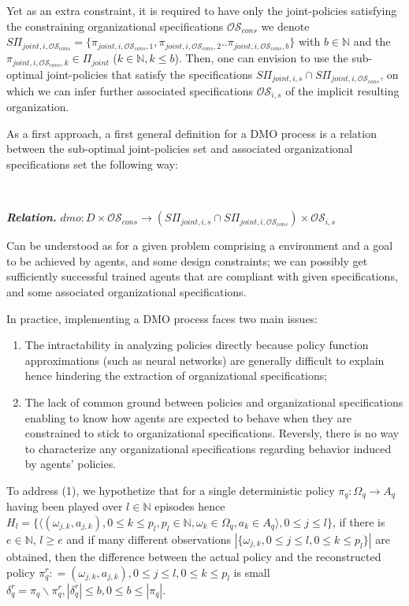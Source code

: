 \documentclass{ecai}
\newcounter{relation}
\renewcommand{\therelation}{\arabic{relation}}
\newenvironment{relation}[1][]{%
    \refstepcounter{relation}%
    \noindent \raggedright \textit{\textbf{Relation. \therelation}} \hfill$}
{%
$ \hfill \phantom{x}

}
\begin{document}
Yet as an extra constraint, it is required to have only the joint-policies satisfying the constraining organizational specifications $\mathcal{OS}_{cons}$ we denote $S\Pi_{joint,i,\mathcal{OS}_{cons}} = \{\pi_{joint,i,\mathcal{OS}_{cons},1}, \pi_{joint,i,\mathcal{OS}_{cons},2} .. \pi_{joint,i,\mathcal{OS}_{cons},b}\}$ with $b \in \mathbb{N}$ and the $\pi_{joint,i,\mathcal{OS}_{cons},k} \in \Pi_{joint}$ ($k \in \mathbb{N}, k \leq b$). Then, one can envision to use the sub-optimal joint-policies that satisfy the specifications $S\Pi_{joint,i,s} \cap S\Pi_{joint,i,\mathcal{OS}_{cons}}$, on which we can infer further associated specifications $\mathcal{OS}_{i,s}$ of the implicit resulting organization.

As a first approach, a first general definition for a DMO process is a relation between the sub-optimal joint-policies set and associated organizational specifications set the following way:

\

\begin{relation}\label{rel:def_dmo}
    dmo: D \times \mathcal{OS}_{cons} \rightarrow (S\Pi_{joint,i,s} \cap S\Pi_{joint,i,\mathcal{OS}_{cons}}) \times \mathcal{OS}_{i,s}
\end{relation}
Can be understood as for a given problem comprising a environment and a goal to be achieved by agents, and some design constraints; we can possibly get sufficiently successful trained agents that are compliant with given specifications, and some associated organizational specifications.

In practice, implementing a DMO process faces two main issues:
%
\begin{enumerate}
    \item The intractability in analyzing policies directly because policy function approximations (such as neural networks) are generally difficult to explain hence hindering the extraction of organizational specifications;
    \item The lack of common ground between policies and organizational specifications enabling to know how agents are expected to behave when they are constrained to stick to organizational specifications. Reversly, there is no way to characterize any organizational specifications regarding behavior induced by agents' policies.
\end{enumerate}

To address (1), we hypothetize that for a single deterministic policy $\pi_q: \Omega_q \rightarrow A_q$ having been played over $l \in \mathbb{N}$ episodes hence $H_l = \{\langle (\omega_{j,k}, a_{j,k}), 0 \leq k \leq p_l, p_l \in \mathbb{N}, \omega_k \in \Omega_q, a_k \in A_q \rangle, 0 \leq j \leq l\}$, if there is $e \in \mathbb{N}$, $l \geq e$ and if many different observations $|\{\omega_{j,k}, 0 \leq j \leq l, 0 \leq k \leq p_l\}|$ are obtained, then the difference between the actual policy and the reconstructed policy $\pi_q^r: = {(\omega_{j,k}, a_{j,k}), 0 \leq j \leq l, 0 \leq k \leq p_l}$ is small $\delta_q^r = \pi_q \backslash \pi_q^r, |\delta_q^r| \leq b, 0 \leq b \leq |\pi_q|$.
\end{document}
